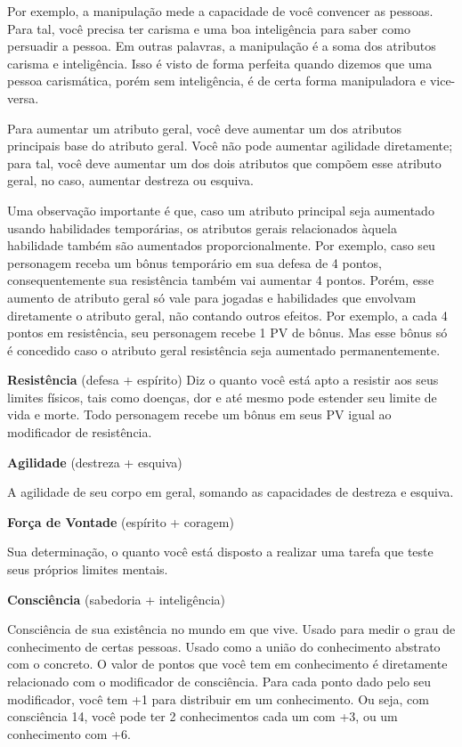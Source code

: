 Por exemplo, a manipulação mede a capacidade de você convencer as pessoas. Para tal, você precisa ter carisma e uma boa inteligência para saber como persuadir a pessoa. Em outras palavras, a manipulação é a soma dos atributos carisma e inteligência. Isso é visto de forma perfeita quando dizemos que uma pessoa carismática, porém sem inteligência, é de certa forma manipuladora e vice-versa. 

Para aumentar um atributo geral, você deve aumentar um dos atributos principais base do atributo geral. Você não pode aumentar agilidade diretamente; para tal, você deve aumentar um dos dois atributos que compõem esse atributo geral, no caso, aumentar destreza ou esquiva.

Uma observação importante é que, caso um atributo principal seja aumentado usando habilidades temporárias, os atributos gerais relacionados àquela habilidade também são aumentados proporcionalmente. Por exemplo, caso seu personagem receba um bônus temporário em sua defesa de 4 pontos, consequentemente sua resistência também vai aumentar 4 pontos. Porém, esse aumento de atributo geral só vale para jogadas e habilidades que envolvam diretamente o atributo geral, não contando outros efeitos. Por exemplo, a cada 4 pontos em resistência, seu personagem recebe 1 PV de bônus. Mas esse bônus só é concedido caso o atributo geral resistência seja aumentado permanentemente.

\textbf{Resistência} (defesa + espírito)
Diz o quanto você está apto a resistir aos seus limites físicos, tais como doenças, dor e até mesmo pode estender seu limite de vida e morte. Todo personagem recebe um bônus em seus PV igual ao modificador de resistência.

\textbf{Agilidade} (destreza + esquiva)

A agilidade de seu corpo em geral, somando as capacidades de destreza e esquiva.

\textbf{Força de Vontade} (espírito + coragem)

Sua determinação, o quanto você está disposto a realizar uma tarefa que teste seus próprios limites mentais.

\textbf{Consciência} (sabedoria + inteligência)

Consciência de sua existência no mundo em que vive. Usado para medir o grau de conhecimento de certas pessoas. Usado como a união do conhecimento abstrato com o concreto. O valor de pontos que você tem em conhecimento é diretamente relacionado com o modificador de consciência. Para cada ponto dado pelo seu modificador, você tem +1 para distribuir em um conhecimento. Ou seja, com consciência 14, você pode ter 2 conhecimentos cada um com +3, ou um conhecimento com +6.

